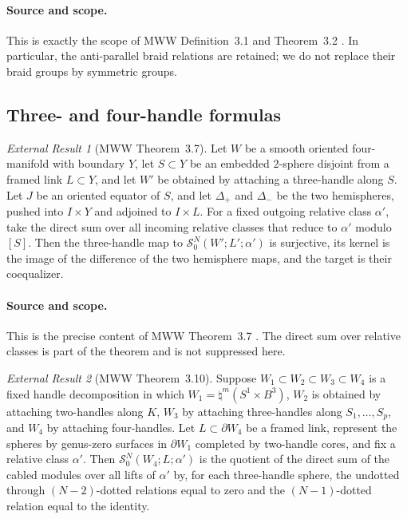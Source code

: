 \documentclass[10pt,reqno]{amsart}
\theoremstyle{definition}
\theoremstyle{remark}
\newtheorem{externalresult}{External Result}
\newcommand{\SLM}{\mathcal S}
\begin{document}
\paragraph{Source and scope.}
This is exactly the scope of MWW Definition~3.1 and Theorem~3.2
\cite[Definition~3.1 and Theorem~3.2]{MWW2023Handles}.  In particular, the
anti-parallel braid relations are retained; we do not replace their braid
groups by symmetric groups.

\subsection{Three- and four-handle formulas}

\begin{externalresult}[MWW Theorem~3.7]\label{prop:mww-3.7}
Let $W$ be a smooth oriented four-manifold with boundary $Y$, let
$S\subset Y$ be an embedded $2$-sphere disjoint from a framed link
$L\subset Y$, and let $W'$ be obtained by attaching a three-handle along
$S$.  Let $J$ be an oriented equator of $S$, and let $\Delta_+$ and
$\Delta_-$ be the two hemispheres, pushed into $I\times Y$ and adjoined to
$I\times L$.  For a fixed outgoing relative class $\alpha'$, take the direct
sum over all incoming relative classes that reduce to $\alpha'$ modulo
$[S]$.  Then the three-handle map to
$\SLM^N_0(W';L';\alpha')$ is surjective, its kernel is the image of the
difference of the two hemisphere maps, and the target is their coequalizer.
\end{externalresult}

\paragraph{Source and scope.}
This is the precise content of MWW Theorem~3.7
\cite[Theorem~3.7]{MWW2023Handles}.  The direct sum over relative classes is
part of the theorem and is not suppressed here.

\begin{externalresult}[MWW Theorem~3.10]\label{prop:mww-3.10}
Suppose
$W_1\subset W_2\subset W_3\subset W_4$ is a fixed handle decomposition in
which $W_1=\natural^m(S^1\times B^3)$, $W_2$ is obtained by attaching
two-handles along $K$, $W_3$ by attaching three-handles along
$S_1,\ldots,S_p$, and $W_4$ by attaching four-handles.  Let
$L\subset\partial W_4$ be a framed link, represent the spheres by genus-zero
surfaces in $\partial W_1$ completed by two-handle cores, and fix a relative
class $\alpha'$.  Then $\SLM^N_0(W_4;L;\alpha')$ is the quotient of the
direct sum of the cabled modules over all lifts of $\alpha'$ by, for each
three-handle sphere, the undotted through $(N-2)$-dotted relations equal to
zero and the $(N-1)$-dotted relation equal to the identity.
\end{externalresult}
\end{document}

